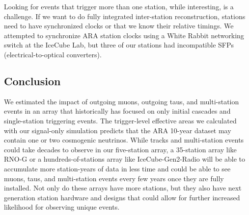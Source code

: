     Looking for events that trigger more than one station, while interesting, is a challenge.
    If we want to do fully integrated inter-station reconstruction, stations need to have synchronized clocks or that we know their relative timings.
    We attempted to synchronize ARA station clocks using a White Rabbit networking switch at the IceCube Lab, but three of our stations had incompatible SFPs (electrical-to-optical converters).
    
  \subsection{Conclusion} 

  We estimated the impact of outgoing muons, outgoing taus, and multi-station events in an array that historically has focused on only initial cascades and single-station triggering events.
  The trigger-level effective areas we calculated with our signal-only simulation predicts that the ARA 10-year dataset may contain one or two cosmogenic neutrinos.
  While tracks and multi-station events could take decades to observe in our five-station array, a 35-station array like \mbox{RNO-G} or a hundreds-of-stations array like IceCube-Gen2-Radio will be able to accumulate more station-years of data in less time and could be able to see muons, taus, and multi-station events every few years once they are fully installed.
  Not only do these arrays have more stations, but they also have next generation station hardware and designs that could allow for further increased likelihood for observing unique events.